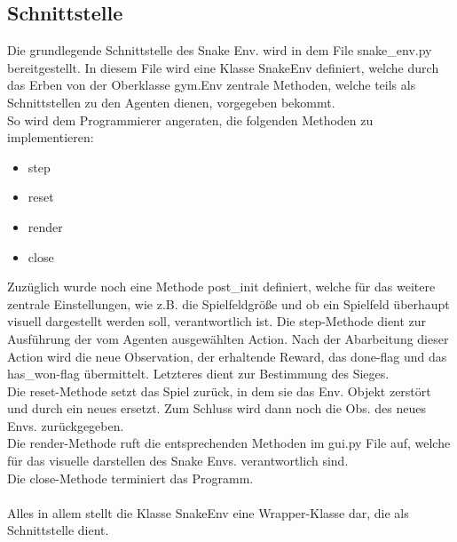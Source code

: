 \subsection{Schnittstelle}
Die grundlegende Schnittstelle des Snake Env. wird in dem File snake\_env.py bereitgestellt. In diesem File wird eine Klasse SnakeEnv definiert, welche durch das Erben von der Oberklasse gym.Env zentrale Methoden, welche teils als Schnittstellen zu den Agenten dienen, vorgegeben bekommt.\\
So wird dem Programmierer angeraten, die folgenden Methoden zu implementieren:
\begin{itemize}
	\item step
	\item reset
	\item render
	\item close
\end{itemize}
Zuzüglich wurde noch eine Methode post\_init definiert, welche für das weitere zentrale Einstellungen, wie z.B. die Spielfeldgröße und ob ein Spielfeld überhaupt visuell dargestellt werden soll, verantwortlich ist. 
Die step-Methode dient zur Ausführung der vom Agenten ausgewählten Action. Nach der Abarbeitung dieser Action wird die neue Observation, der erhaltende Reward, das done-flag und das has\_won-flag übermittelt. Letzteres dient zur Bestimmung des Sieges.\\
Die reset-Methode setzt das Spiel zurück, in dem sie das Env. Objekt zerstört und durch ein neues ersetzt. Zum Schluss wird dann noch die Obs. des neues Envs. zurückgegeben.\\
Die render-Methode ruft die entsprechenden Methoden im gui.py File auf, welche für das visuelle darstellen des Snake Envs. verantwortlich sind.\\
Die close-Methode terminiert das Programm.\\
\\Alles in allem stellt die Klasse SnakeEnv eine Wrapper-Klasse dar, die als Schnittstelle dient.


